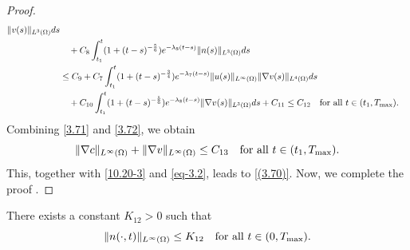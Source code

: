 \documentclass[reqno]{amsart}
\begin{document}
\begin{proof}
\begin{equation}
\begin{aligned}
 \| v(s) \|_{L^3(\Omega)} ds \\
&\quad + C_8 \int_{t_1}^t ( 1 + (t - s)^{-\frac{5}{6}} )
e^{-\lambda_8(t - s)} \| n(s) \|_{L^3(\Omega)} ds \\
&\leq C_9 + C_7 \int_{t_1}^t ( 1 + (t - s)^{-\frac{3}{4}} ) e^{-\lambda_7(t - s)}
 \| u(s) \|_{L^\infty(\Omega)} \| \nabla v(s) \|_{L^4(\Omega)} ds  \\
&\quad + C_{10} \int_{t_1}^t ( 1 + (t - s)^{-\frac{5}{6}} ) e^{-\lambda_8(t - s)}
 \| \nabla v(s) \|_{L^3(\Omega)} ds
+ C_{11} \leq C_{12}  \quad \text{for all } t \in (t_1, T_{\rm max}).
\end{aligned}
\end{equation}
Combining \eqref{3.71} and \eqref{3.72}, we obtain
\[
\|\nabla c\|_{L^\infty(\Omega)} + \|\nabla v\|_{L^\infty(\Omega)}
\leq C_{13}   \quad \text{for all } t \in (t_1, T_{\rm max}).
\]
This, together with \eqref{10.20-3} and \eqref{eq-3.2}, leads to \eqref{(3.70)}.
 Now, we complete the proof .
 \end{proof}

\begin{lemma}\label{lem3.11}
There exists a constant $K_{12}>0$ such that
\begin{equation}\label{3.73}
\| n(\cdot, t) \|_{L^\infty(\Omega)} \leq K_{12}
\quad \text{for all } t \in (0, T_{\rm max}).
\end{equation}
\end{lemma}
\end{document}
